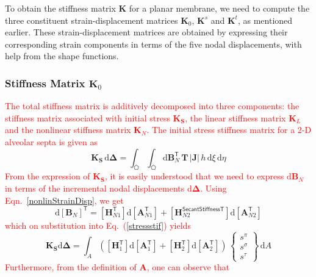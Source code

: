 To obtain the stiffness matrix $\mathbf{K}$ for a planar membrane, we need to compute the three constituent strain-displacement matrices $\mathbf{K}_0$, $\mathbf{K}^s$ and $\mathbf{K}^t$, as mentioned earlier. These strain-displacement matrices are obtained by expressing their corresponding strain components in terms of the five nodal displacements, with help from the shape functions.

\subsubsection{Stiffness Matrix $\mathbf{K}_0$}

\textcolor{red}{The total stiffness matrix is additively decomposed into three components: the stiffness matrix associated with initial stress $\mathbf{K_S}$, the linear stiffness matrix $\mathbf{K}_L$ and the nonlinear stiffness matrix $\mathbf{K}_N$. The initial stress stiffness matrix  for a 2-D alveolar septa is given as}
\begin{equation}
\mathbf{K}_\mathbf{S}\,\mathrm{d}\boldsymbol{\Delta} = \int_{\pentagon} \int_{\pentagon}  \mathrm{d} \mathbf{B}_N^{\mathsf{T}} \, \mathbf{T} \, |\mathbf{J}|  \, h \,  \mathrm{d} \xi \,  \mathrm{d} \eta \label{stressstif}
\end{equation}
\textcolor{red}{From the expression of $\mathbf{K_{\mathbf{S}}}$, it is easily understood that we need to express $\mathrm{d}\mathbf{B}_N$ in terms of the incremental nodal displacements $\mathrm{d}\boldsymbol{\Delta}$. Using Eqn.~\eqref{nonlinStrainDisp}, we get}
\begin{equation}
\mathrm{d}[\mathbf{B}_N]^{\mathsf{T}} = [\mathbf{H}_{N1}^{\mathsf{T}}] \mathrm{d} [\mathbf{A}_{N1}^{\mathsf{T}}] + [\mathbf{H}_{N2}^{\mathsf{Secant StiffnessT}}] \mathrm{d} [\mathbf{A}_{N2}^{\mathsf{T}}] 
\end{equation}
\textcolor{red}{which on substitution into Eq.~(\ref{stressstif}) yields} 
\begin{equation}
\mathbf{K_\mathbf{S}} \mathrm{d} \boldsymbol{\Delta} = \int_A \left(
[\mathbf{H}_1^{\mathsf{T}}] \mathrm{d} [\mathbf{A}_1^{\mathsf{T}}] + [\mathbf{H}_2^{\mathsf{T}}] \mathrm{d} [\mathbf{A}_2^{\mathsf{T}}]\right) \, \begin{Bmatrix} s^{\pi} \\ s^{\sigma} \\  s^{\tau} \end{Bmatrix} \, \mathrm{d} A
\label{initstiff}
\end{equation}
\textcolor{red}{Furthermore, from the definition of $\mathbf{A}$, one can observe that}
